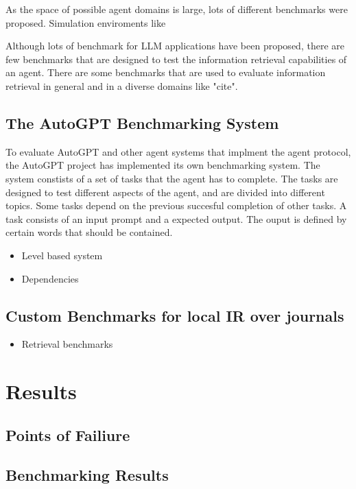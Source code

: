 \documentclass[english, version-2022-01]{uzl-thesis}
\begin{document}
As the space of possible agent domains is large, lots of different benchmarks were proposed. Simulation enviroments like

Although lots of benchmark for LLM applications have been proposed, there are few benchmarks that are designed to test the information retrieval capabilities of an agent. There are some benchmarks that are used to evaluate information retrieval in general and in a diverse domains like "cite".

\section{The AutoGPT Benchmarking System}

To evaluate AutoGPT and other agent systems that implment the agent protocol, the AutoGPT project has implemented its own benchmarking system. The system constists of a set of tasks that the agent has to complete. The tasks are designed to test different aspects of the agent, and are divided into different topics. Some tasks depend on the previous succesful completion of other tasks. A task consists of an input prompt and a expected output. The ouput is defined by certain words that should be contained.

\begin{itemize}
	\item Level based system
	\item Dependencies
\end{itemize}

\section{Custom Benchmarks for local IR over journals}

\begin{itemize}
	\item Retrieval benchmarks
\end{itemize}

\chapter{Results}

\section{Points of Failiure}

\section{Benchmarking Results}
\end{document}
